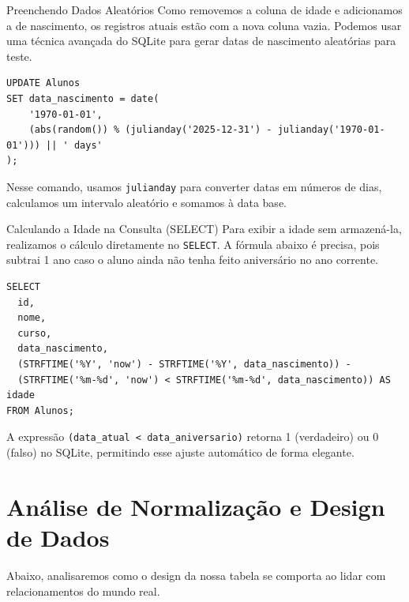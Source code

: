 \documentclass[12pt]{article}
\begin{document}
\begin{block}{Preenchendo Dados Aleatórios}
Como removemos a coluna de idade e adicionamos a de nascimento, os registros atuais estão com a nova coluna vazia. Podemos usar uma técnica avançada do SQLite para gerar datas de nascimento aleatórias para teste.

\begin{lstlisting}
UPDATE Alunos
SET data_nascimento = date(
    '1970-01-01',
    (abs(random()) % (julianday('2025-12-31') - julianday('1970-01-01'))) || ' days'
);
\end{lstlisting}

Nesse comando, usamos \texttt{julianday} para converter datas em números de dias, calculamos um intervalo aleatório e somamos à data base.
\end{block}

\begin{block}{Calculando a Idade na Consulta (SELECT)}
Para exibir a idade sem armazená-la, realizamos o cálculo diretamente no \texttt{SELECT}. A fórmula abaixo é precisa, pois subtrai 1 ano caso o aluno ainda não tenha feito aniversário no ano corrente.

\begin{lstlisting}
SELECT
  id,
  nome,
  curso,
  data_nascimento,
  (STRFTIME('%Y', 'now') - STRFTIME('%Y', data_nascimento)) - 
  (STRFTIME('%m-%d', 'now') < STRFTIME('%m-%d', data_nascimento)) AS idade
FROM Alunos;
\end{lstlisting}
\end{block}

\begin{dica}
A expressão \texttt{(data\_atual < data\_aniversario)} retorna 1 (verdadeiro) ou 0 (falso) no SQLite, permitindo esse ajuste automático de forma elegante.
\end{dica}
\section{Análise de Normalização e Design de Dados}

Abaixo, analisaremos como o design da nossa tabela se comporta ao lidar com relacionamentos do mundo real.
\end{document}
